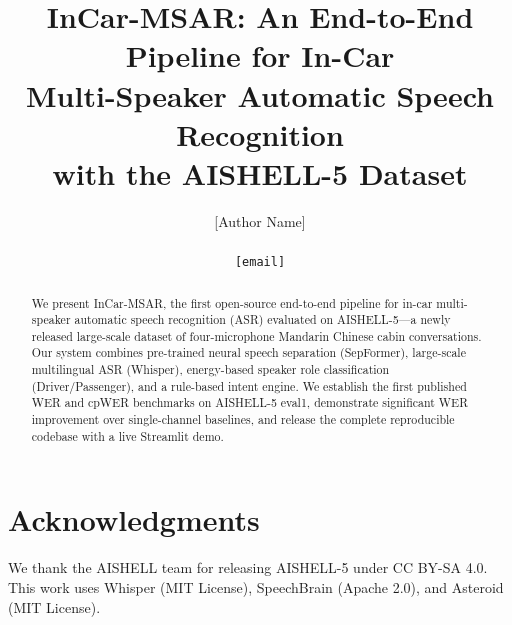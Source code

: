 \documentclass[a4paper]{article}
\title{InCar-MSAR: An End-to-End Pipeline for In-Car\\
Multi-Speaker Automatic Speech Recognition\\
with the AISHELL-5 Dataset}
\author{%
    [Author Name]\\
    \relax[Institution]\\
    \texttt{[email]}%
}
\date{}
\begin{document}
\maketitle

\begin{abstract}
We present InCar-MSAR, the first open-source end-to-end pipeline for
in-car multi-speaker automatic speech recognition (ASR) evaluated on
AISHELL-5—a newly released large-scale dataset of four-microphone Mandarin
Chinese cabin conversations. Our system combines pre-trained neural speech
separation (SepFormer), large-scale multilingual ASR (Whisper), energy-based
speaker role classification (Driver/Passenger), and a rule-based intent engine.
We establish the first published WER and cpWER benchmarks on AISHELL-5 eval1,
demonstrate significant WER improvement over single-channel baselines, and
release the complete reproducible codebase with a live Streamlit demo.
\end{abstract}







\section*{Acknowledgments}
We thank the AISHELL team for releasing AISHELL-5 under CC BY-SA 4.0.
This work uses Whisper (MIT License), SpeechBrain (Apache 2.0), and Asteroid (MIT License).



\end{document}
